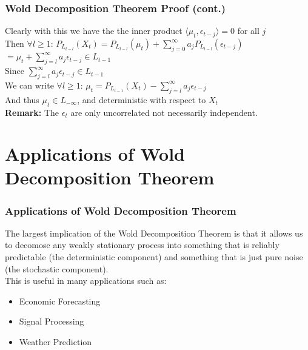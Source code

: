 \documentclass{beamer}
\begin{document}
\begin{frame}
    \frametitle{Wold Decomposition Theorem Proof (cont.)}
    Clearly with this we have the the inner product $\langle \mu_t, \epsilon_{t-j} \rangle = 0$ for all $j$\\
    Then $\forall l \geq 1$: $P_{L_{t-l}}(X_t) = P_{L_{t-l}}(\mu_t) + \sum_{j=0}^{\infty} a_j P_{L_{t-l}}(\epsilon_{t-j})$\\
    $= \mu_t + \sum_{j=l}^{\infty} a_j \epsilon_{t-j} \in L_{t-1}$\\
    Since $\sum_{j=l}^{\infty} a_j \epsilon_{t-j} \in L_{t-1}$\\ 
    We can write $\forall l \geq 1$: $\mu_t = P_{L_{t-1}}(X_t) - \sum_{j=l}^{\infty} a_j \epsilon_{t-j}$\\ 
    And thus $\mu_t \in L_{-\infty}$, and deterministic with respect to $X_t$\\
    \textbf{Remark:} The $\epsilon_t$ are only uncorrelated not necessarily independent. 
\end{frame}

\section{Applications of Wold Decomposition Theorem}
\begin{frame}
    \frametitle{Applications of Wold Decomposition Theorem}
    The largest implication of the Wold Decomposition Theorem is that it allows us to decomose any weakly stationary process into something that is reliably predictable (the deterministic component) and something that is just pure noise (the stochastic component).\\
    This is useful in many applications such as:
    \begin{itemize}
        \item Economic Forecasting
        \item Signal Processing
        \item Weather Prediction
    \end{itemize}
    
\end{frame}
\end{document}
